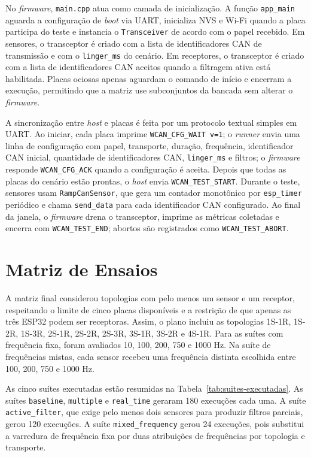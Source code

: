 No \emph{firmware}, \texttt{main.cpp} atua como camada de inicialização. A função \texttt{app\_main} aguarda a configuração de \emph{boot} via UART, inicializa NVS e Wi-Fi quando a placa participa do teste e instancia o \texttt{Transceiver} de acordo com o papel recebido. Em sensores, o transceptor é criado com a lista de identificadores CAN de transmissão e com o \texttt{linger\_ms} do cenário. Em receptores, o transceptor é criado com a lista de identificadores CAN aceitos quando a filtragem ativa está habilitada. Placas ociosas apenas aguardam o comando de início e encerram a execução, permitindo que a matriz use subconjuntos da bancada sem alterar o \emph{firmware}.

A sincronização entre \emph{host} e placas é feita por um protocolo textual simples em UART. Ao iniciar, cada placa imprime \texttt{WCAN\_CFG\_WAIT v=1}; o \emph{runner} envia uma linha de configuração com papel, transporte, duração, frequência, identificador CAN inicial, quantidade de identificadores CAN, \texttt{linger\_ms} e filtros; o \emph{firmware} responde \texttt{WCAN\_CFG\_ACK} quando a configuração é aceita. Depois que todas as placas do cenário estão prontas, o \emph{host} envia \texttt{WCAN\_TEST\_START}. Durante o teste, sensores usam \texttt{RampCanSensor}, que gera um contador monotônico por \texttt{esp\_timer} periódico e chama \texttt{send\_data} para cada identificador CAN configurado. Ao final da janela, o \emph{firmware} drena o transceptor, imprime as métricas coletadas e encerra com \texttt{WCAN\_TEST\_END}; abortos são registrados como \texttt{WCAN\_TEST\_ABORT}.

\section{Matriz de Ensaios}

A matriz final considerou topologias com pelo menos um sensor e um receptor, respeitando o limite de cinco placas disponíveis e a restrição de que apenas as três ESP32 podem ser receptoras. Assim, o plano incluiu as topologias 1S-1R, 1S-2R, 1S-3R, 2S-1R, 2S-2R, 2S-3R, 3S-1R, 3S-2R e 4S-1R. Para as suítes com frequência fixa, foram avaliados 10, 100, 200, 750 e 1000 Hz. Na suíte de frequências mistas, cada sensor recebeu uma frequência distinta escolhida entre 100, 200, 750 e 1000 Hz.

As cinco suítes executadas estão resumidas na Tabela~\ref{tab:suites-executadas}. As suítes \texttt{baseline}, \texttt{multiple} e \texttt{real\_time} geraram 180 execuções cada uma. A suíte \texttt{active\_filter}, que exige pelo menos dois sensores para produzir filtros parciais, gerou 120 execuções. A suíte \texttt{mixed\_frequency} gerou 24 execuções, pois substitui a varredura de frequência fixa por duas atribuições de frequências por topologia e transporte.

